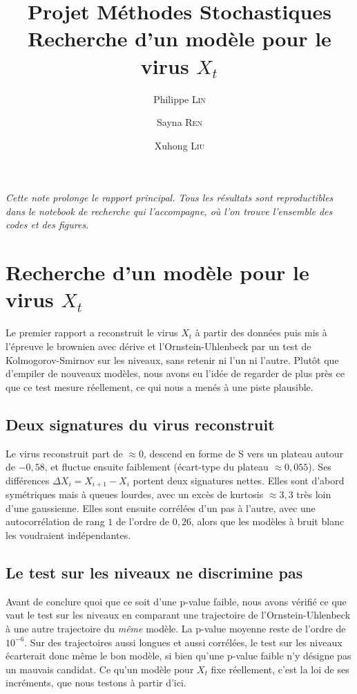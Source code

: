 \documentclass[11pt,a4paper]{article}
\title{Projet Méthodes Stochastiques\\[0.3em]
       \large Recherche d'un modèle pour le virus $X_t$}
\author{Philippe \textsc{Lin} \and Sayna \textsc{Ren} \and Xuhong \textsc{Liu}}
\date{}
\begin{document}
\maketitle

\textit{Cette note prolonge le rapport principal. Tous les résultats sont reproductibles dans le notebook de recherche qui l'accompagne, où l'on trouve l'ensemble des codes et des figures.}

\section*{Recherche d'un modèle pour le virus $X_t$}

Le premier rapport a reconstruit le virus $X_t$ à partir des données puis mis à l'épreuve le brownien avec dérive et l'Ornstein-Uhlenbeck par un test de Kolmogorov-Smirnov sur les niveaux, sans retenir ni l'un ni l'autre. Plutôt que d'empiler de nouveaux modèles, nous avons eu l'idée de regarder de plus près ce que ce test mesure réellement, ce qui nous a menés à une piste plausible.

\subsection*{Deux signatures du virus reconstruit}

Le virus reconstruit part de $\approx 0$, descend en forme de S vers un plateau autour de $-0{,}58$, et fluctue ensuite faiblement (écart-type du plateau $\approx 0{,}055$). Ses différences $\Delta X_i = X_{i+1}-X_i$ portent deux signatures nettes. Elles sont d'abord symétriques mais à queues lourdes, avec un excès de kurtosis $\approx 3{,}3$ très loin d'une gaussienne. Elles sont ensuite corrélées d'un pas à l'autre, avec une autocorrélation de rang $1$ de l'ordre de $0{,}26$, alors que les modèles à bruit blanc les voudraient indépendantes.

\subsection*{Le test sur les niveaux ne discrimine pas}

Avant de conclure quoi que ce soit d'une p-value faible, nous avons vérifié ce que vaut le test sur les niveaux en comparant une trajectoire de l'Ornstein-Uhlenbeck à une autre trajectoire du \emph{même} modèle. La p-value moyenne reste de l'ordre de $10^{-6}$. Sur des trajectoires aussi longues et aussi corrélées, le test sur les niveaux écarterait donc même le bon modèle, si bien qu'une p-value faible n'y désigne pas un mauvais candidat. Ce qu'un modèle pour $X_t$ fixe réellement, c'est la loi de ses incréments, que nous testons à partir d'ici.
\end{document}
